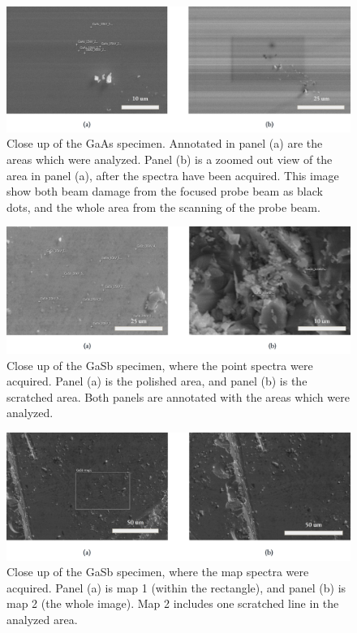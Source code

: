 \begin{figure}[htbp]
    \centering
    \includegraphics[width=.95\textwidth]{figures/SE_images/GaAs_close.jpg}
    \caption{
        Close up of the GaAs specimen.
        Annotated in panel (a) are the areas which were analyzed.
        Panel (b) is a zoomed out view of the area in panel (a), after the spectra have been acquired.
        This image show both beam damage from the focused probe beam as black dots, and the whole area from the scanning of the probe beam.
    }
    \label{fig:SE_images:GaAs}
\end{figure}


\begin{figure}[htbp]
    \centering
    \includegraphics[width=.95\textwidth]{figures/SE_images/GaSb_close.jpg}
    \caption{
        Close up of the GaSb specimen, where the point spectra were acquired.
        Panel (a) is the polished area, and panel (b) is the scratched area.
        Both panels are annotated with the areas which were analyzed.
    }
    \label{fig:SE_images:GaSb}
\end{figure}


\begin{figure}[htbp]
    \centering
    \includegraphics[width=.95\textwidth]{figures/SE_images/GaSb_map.jpg}
    \caption{
        Close up of the GaSb specimen, where the map spectra were acquired.
        Panel (a) is map 1 (within the rectangle), and panel (b) is map 2 (the whole image).
        Map 2 includes one scratched line in the analyzed area.
    }
    \label{fig:SE_images:GaSb_map}
\end{figure}




